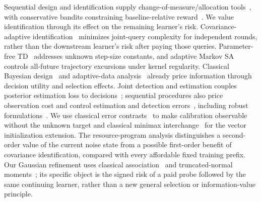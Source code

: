 \documentclass[journal]{IEEEtran}
\begin{document}
Sequential design and identification supply change-of-measure/allocation tools~\cite{chernoff1959sequential,nitinawarat2015controlled,kaufmann2016complexity,garivier2016optimal,moulos2019markovian,saad2023covariance,vannella2023multiagent}, with conservative bandits constraining baseline-relative reward~\cite{wu2016conservative}.
We value identification through its effect on the remaining learner's risk.
Covariance-adaptive identification~\cite{saad2023covariance} minimizes joint-query complexity for independent rounds, rather than the downstream learner's risk after paying those queries.
Parameter-free TD~\cite{li2026parameterfree} addresses unknown step-size constants, and adaptive Markov SA~\cite{li2026shrinkingtube} controls all-future trajectory excursions under kernel regularity.
Classical Bayesian design~\cite{chaloner1995bayesian} and adaptive-data analysis~\cite{russo2016bias} already price information through decision utility and selection effects.
Joint detection and estimation couples posterior estimation loss to decisions~\cite{moustakides2012joint,vasconcelos2020observation}; sequential procedures also price observation cost and control estimation and detection errors~\cite{reinhard2024asymptotic}, including robust formulations~\cite{reinhard2026minimax}.
We use classical error contrasts~\cite{harville1974contrasts} to make calibration observable without the unknown target and classical minimax interchange~\cite{sion1958minimax} for the vector initialization extension.
The resource-program analysis distinguishes a second-order value of the current noise state from a possible first-order benefit of covariance identification, compared with every affordable fixed training prefix.
Our Gaussian refinement uses classical association~\cite{esary1967association} and truncated-normal moments~\cite{manjunath2021moments}; its specific object is the signed risk of a paid probe followed by the same continuing learner, rather than a new general selection or information-value principle.
\end{document}
